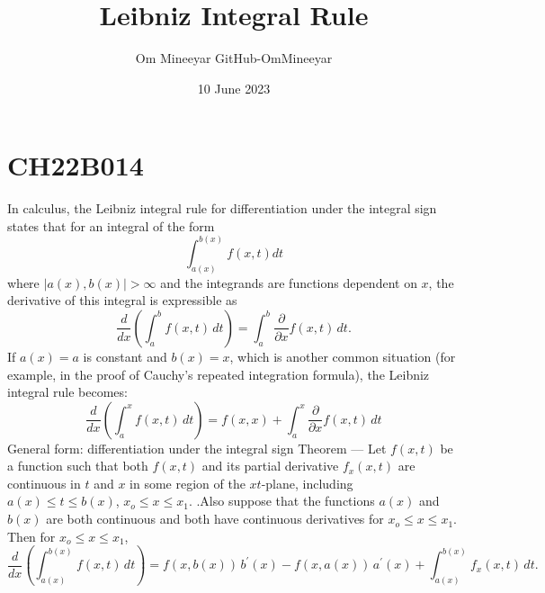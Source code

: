 \documentclass[pdftex]{article}
\title{Leibniz Integral Rule}
\author{Om Mineeyar GitHub-OmMineeyar}
\date{10 June 2023}
\begin{document}
\maketitle

\section*{CH22B014}
In calculus, the Leibniz integral rule for differentiation under the integral sign states that for an integral of the form
\begin{equation}
	\int_{a(x)}^{b(x)}{f(x,t)dt}
\end{equation}
where $|{a(x),b(x)}|>{\infty}$ and the integrands are functions dependent on $x$, the derivative of this integral is expressible as
\begin{equation}
    {\displaystyle {\frac {d}{dx}}\left(\int _{a}^{b}f(x,t)\,dt\right)=\int _{a}^{b}{\frac {\partial }{\partial x}}f(x,t)\,dt.}
\end{equation}
If $a(x)=a$ is constant and $b(x)=x$, which is another common situation (for example, in the proof of Cauchy's repeated integration formula), the Leibniz integral rule becomes:
\begin{equation}
{{\frac {d}{dx}}\left(\int _{a}^{x}f(x,t)\,dt\right)=f{(x,x)}+\int _{a}^{x}{\frac {\partial }{\partial x}}f(x,t)\,dt}
\end{equation}
\Large{General form: differentiation under the integral sign}
\normalsize
\newline
\newline
Theorem — Let $f(x,t)$ be a function such that both $f(x,t)$ and its partial derivative $f_{x}(x,t)$ are continuous in $t$ and $x$ in some region of the 
$xt$-plane, including $a(x){\le}t{\le}b(x)$, $x_o{\le}x{\le}x_1$. .Also suppose that the functions $a(x)$ and $b(x)$ are both continuous and both have continuous derivatives for  $x_o{\le}x{\le}x_1$. Then for  $x_o{\le}x{\le}x_1$,
\begin{equation}
{{\frac {d}{dx}}\left(\int _{a(x)}^{b(x)}f(x,t)\,dt\right)=f(x,b(x))\,b^{\prime }(x)-f(x,a(x))\,a^{\prime }(x)+\displaystyle \int _{a(x)}^{b(x)}f_{x}(x,t)\,dt.}
\end{equation}
\end{document}

